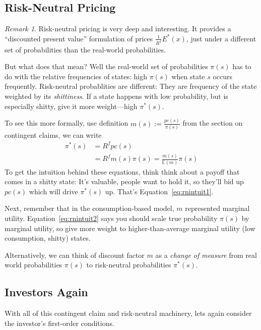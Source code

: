 \documentclass[12pt]{article}
\theoremstyle{plain}
\theoremstyle{definition}
\theoremstyle{remark}
\newtheorem*{rmk}{Remark}
\begin{document}
\subsection{Risk-Neutral Pricing}

\begin{rmk}
Risk-neutral pricing is very deep and interesting. It provides a
``discounted present value'' formulation of prices
$\frac{1}{R^f}E^*(x)$, just under a different set of probabilities than
the real-world probabilities.

But what does that mean? Well the real-world set of probabilities
$\pi(s)$ has to do with the relative frequencies of states: high
$\pi(s)$ when state $s$ occurs frequently. Risk-neutral probablities are
different: They are frequency of the state weighted by its
\emph{shittiness}. If a state happens with low probability, but is
especially shitty, give it more weight---high $\pi^*(s)$.

To see this more formally, use definition $m(s):= \frac{pc(s)}{\pi(s)}$
from the section on contingent claims, we can write
\begin{align}
  \pi^*(s) &= R^f pc(s) \label{eq:rnintuit1}\\
  &= R^f m(s) \pi(s) = \frac{m(s)}{\mathbb{E}(m)} \pi(s)
  \label{eq:rnintuit2}
\end{align}
To get the intuition behind these equations, think think about a payoff
that comes in a shitty state: It's valuable, people want to hold it, so
they'll bid up $pc(s)$ which will drive $\pi^*(s)$ up. That's
Equation~\ref{eq:rnintuit1}.

Next, remember that in the consumption-based model, $m$ represented
marginal utility. Equation~\ref{eq:rnintuit2} says you should scale true
probability $\pi(s)$ by marginal utility, so give more weight to
higher-than-average marginal utility (low consumption, shitty) states.

Alternatively, we can think of discount factor $m$ as a \emph{change of
measure} from real world probabilities $\pi(s)$ to risk-neutral
probabilities $\pi^*(s)$.
\end{rmk}

\subsection{Investors Again}

With all of this contingent claim and risk-neutral machinery, lets again
consider the investor's first-order conditions.
\end{document}

